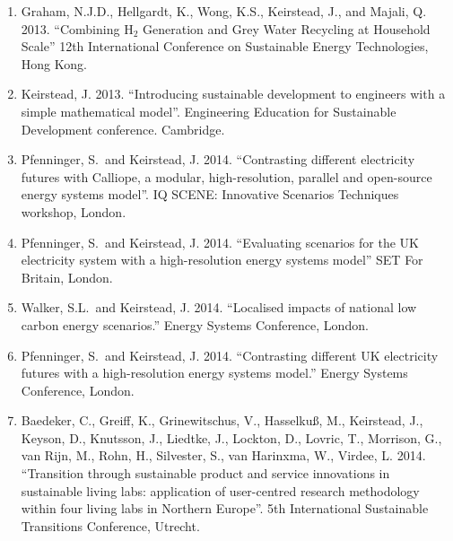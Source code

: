 \documentclass[11pt,a4paper]{article}
\begin{document}
\begin{enumerate}
\item Graham, N.J.D., Hellgardt, K., Wong, K.S., Keirstead, J., and Majali, Q. 2013. ``Combining H$_2$ Generation and Grey Water Recycling at Household Scale'' 12th International Conference on Sustainable Energy Technologies, Hong Kong.

\item Keirstead, J. 2013. ``Introducing sustainable development to engineers with a simple mathematical model''.  Engineering Education for Sustainable Development conference.  Cambridge.

\item Pfenninger, S.\ and Keirstead, J. 2014. ``Contrasting different electricity futures with Calliope, a modular, high-resolution, parallel and open-source energy systems model''.  IQ SCENE: Innovative Scenarios Techniques workshop, London.

\item Pfenninger, S.\ and Keirstead, J. 2014. ``Evaluating scenarios for the UK electricity system with a high-resolution energy systems model'' SET For Britain, London.

\item Walker, S.L.\ and Keirstead, J. 2014. ``Localised impacts of national low carbon energy scenarios.''  Energy Systems Conference, London.

\item Pfenninger, S.\ and Keirstead, J. 2014. ``Contrasting different UK electricity futures with a high-resolution energy systems model.''  Energy Systems Conference, London.

\item Baedeker, C., Greiff, K., Grinewitschus, V., Hasselku{\ss}, M., Keirstead, J., Keyson, D., Knutsson, J., Liedtke, J., Lockton, D., Lovric, T., Morrison, G., van Rijn, M., Rohn, H., Silvester, S., van Harinxma, W., Virdee, L. 2014. ``Transition through sustainable product and service innovations in sustainable living labs: application of user-centred research methodology within four living labs in Northern Europe''.  5th International Sustainable Transitions Conference, Utrecht. 

\end{enumerate}

\bigskip
\end{document}
